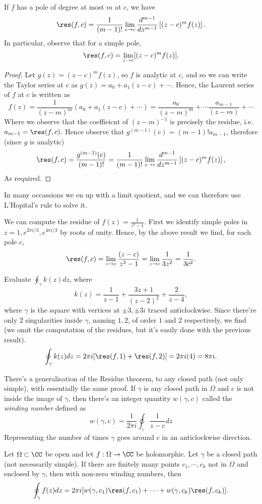 \begin{proposition}
  If $f$ has a pole of degree at most $m$ at $c$, we have 
  \[\res(f,c)= \frac{1}{(m-1)!} \lim_{z\to c} \frac{d^{m-1}}{dz^{m-1}}\left[
  (z-c)^m f(z) \right].\]
  In particular, observe that for a simple pole, 
  \[\res(f,c) = \lim_{z\to c}[(z-c)^mf(z)].\]
  \label{prop:residuePole}
\end{proposition}
\begin{proof}
  Let $g(z)=(z-c)^mf(z)$, so $f$ is analytic at $c$, and so we can write the
  Taylor series at $c$ as $g(z)= a_0 + a_1 (z-c)+\cdots$. Hence, the Laurent
  series of $f$ at $c$ is written as 
  \[f(z)= \frac{1}{(z-m)^m} (a_0 + a_1 (z-c)+\cdots)=
  \frac{a_0}{(z-m)^{m}}+\cdots \frac{a_{m-1}}{(z-m)}+ \cdots\]
  Where we observe that the coeffieicnt of $(z-m)^{-1}$ is precisely the
  residue, i.e. $a_{m-1}=\res(f,c)$. Hence observe that
  $g^{(m-1)}(c)=(m-1)!a_{m-1}$, therefore (since $g$ is analytic)
  \[\res(f,c) = \frac{g^{(m-1)}(c)}{(m-1)!}= \frac{1}{(m-1)!}\lim_{z\to c}
  \frac{d^{m-1}}{dz^{m-1}}\left[ (z-c)^m f(z) \right],\]
  As required.
\end{proof}
In many occassions we en up with a limit quotient, and we can therefore use
L'Hopital's rule to solve it.
\begin{example}
  We can compute the residue of $f(z)=\frac{1}{z^3-1}$. First we identify simple
  poles in $z=1,e^{2\pi i/3}, e^{4\pi i /3}$ by roots of unity. Hence, by the
  above result we find, for each pole $c$,
  \[\res(f,c)= \lim_{z\to c} \frac{(z-c)}{z^3-1}=\lim_{z\to c}
  \frac{1}{3z^2} =\frac{1}{3c^2}. \]
\end{example}
\begin{example}
  Evaluate $\oint_{\gamma} k(z)dz$, where 
  \[k(z)=\frac{1}{z-1}+ \frac{3z+1}{(z-2)^2} + \frac{2}{z-4},\]
  where $\gamma$ is the square with vertices at $\pm 3, \pm 3i$ traced
  anticlockwise. Since there're only 2 singularities inside $\gamma$, naming
  $1,2$, of order $1$ and $2$ respectively, we find (we omit the computation of
  the residues, but it's easily done with the previous result).
  \[\oint_{\gamma}k(z)dz = 2\pi i [\res(f,1)+\res(f,2)] = 2\pi i (4) = 8\pi i.\]
\end{example}

There's a generalisation of the Residue theorem, to any closed path (not only
simple), with essentially the same proof. If $\gamma$ is any closed path in
$\Omega$ and $c$ is not inside the image of $\gamma$, then there's an integer
quantity $w(\gamma, c)$ called the \emph{winding number} defined as 
\[w(\gamma,c)=\frac{1}{2\pi i}\oint_{\gamma} \frac{1}{z-c} dz\]
Representing the number of times $\gamma$ goes around $c$ in an anticlockwise
direction.
\begin{theorem}
  Let $\Omega\subset\CC$ be open and let $f:\Omega\to\CC$ be holomorphic. Let
  $\gamma$ be a closed path (not necessarily simple). If there are finitely many
  points $c_1,\cdots, c_k$ not in $\Omega$ and enclosed by $\gamma$, then with
  non-zero winding numbers, then
  \[\oint_{\gamma}f(z)dz = 2\pi i [w(\gamma, c_1)\res(f, c_1)+\cdots+ w(\gamma,
  c_k)\res(f, c_k)].\]
  \label{thm:generalResidueThm}
\end{theorem}
